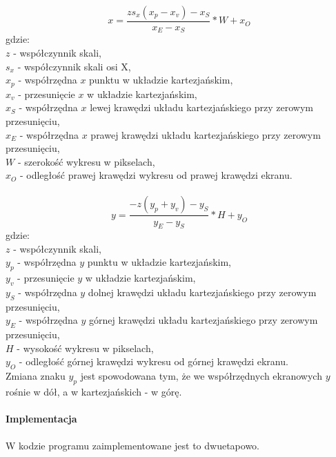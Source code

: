 \documentclass[12pt]{report}
\begin{document}
	\begin{equation}
		x = \frac{zs_x(x_p - x_v) - x_{S}}{x_{E} - x_{S}} * W + x_O
	\end{equation}
	gdzie: \\
	$z$ - współczynnik skali, \\
	$s_x$ - współczynnik skali osi X, \\
	$x_p$ - współrzędna $x$ punktu w układzie kartezjańskim, \\
	$x_v$ - przesunięcie $x$ w układzie kartezjańskim, \\
	$x_S$ - współrzędna $x$ lewej krawędzi układu kartezjańskiego przy zerowym przesunięciu, \\
	$x_E$ - współrzędna $x$ prawej krawędzi układu kartezjańskiego przy zerowym przesunięciu, \\
	$W$ - szerokość wykresu w pikselach, \\
	$x_O$ - odległość prawej krawędzi wykresu od prawej krawędzi ekranu.
	\\\\
	
	\begin{equation}
		y = \frac{-z(y_p + y_v) - y_{S}}{y_{E} - y_{S}} * H + y_O
	\end{equation}
	gdzie: \\
	$z$ - współczynnik skali, \\
	$y_p$ - współrzędna $y$ punktu w układzie kartezjańskim, \\
	$y_v$ - przesunięcie $y$ w układzie kartezjańskim, \\
	$y_S$ - współrzędna $y$ dolnej krawędzi układu kartezjańskiego przy zerowym przesunięciu, \\
	$y_E$ - współrzędna $y$ górnej krawędzi układu kartezjańskiego przy zerowym przesunięciu, \\
	$H$ - wysokość wykresu w pikselach, \\
	$y_O$ - odległość górnej krawędzi wykresu od górnej krawędzi ekranu. \\
	
	Zmiana znaku $y_p$ jest spowodowana tym, że we współrzędnych ekranowych $y$ rośnie w dół, a w kartezjańskich - w górę.
	
	\pagebreak
	\paragraph{Implementacja}
	\paragraph{}
	W kodzie programu zaimplementowane jest to dwuetapowo.
\end{document}
